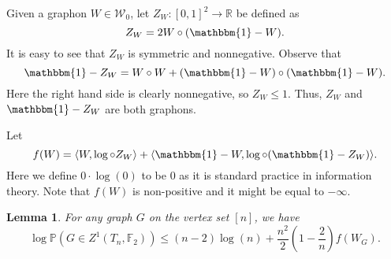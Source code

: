 \documentclass[11pt,a4paper]{article}
\theoremstyle{plain}
\newtheorem{lemma}[theorem]{Lemma}
\theoremstyle{definition}
\begin{document}
Given a graphon $W\in \mathcal{W}_0$, let $Z_W:[0,1]^2\to \mathbb{R}$ be defined as
\[Z_W=2W\circ (\mathbbm{1}-W).\]
It is easy to see that $Z_W$ is symmetric and nonnegative. Observe that
\[\mathbbm{1}-Z_W=W\circ W+(\mathbbm{1}-W)\circ (\mathbbm{1}-W).\]
Here the right hand side is clearly  nonnegative, so $Z_W\le 1$. Thus, $Z_W$ and $\mathbbm{1}-Z_W$ are both graphons. 

Let
\begin{equation}\label{fdef}f(W)=\langle W, \log\circ Z_W\rangle+\langle \mathbbm{1}-W, \log\circ(\mathbbm{1}- Z_W)\rangle.\end{equation}
Here we define $0\cdot \log(0)$ to be $0$ as it is standard practice in information theory. Note that $f(W)$ is non-positive and it might be equal to $-\infty$. 

\begin{lemma}\label{upperbf}
For any graph $G$ on the vertex set $[n]$, we have 
\[\log \mathbb{P}(G\in Z^1(T_n,\mathbb{F}_2))\le (n-2)\log (n)+\frac{n^2}2\left(1-\frac{2}n\right)f(W_G).\]
\end{lemma}
\end{document}
